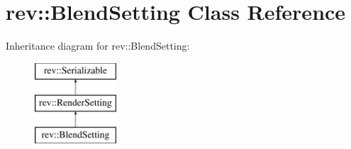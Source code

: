 \hypertarget{classrev_1_1_blend_setting}{}\section{rev\+::Blend\+Setting Class Reference}
\label{classrev_1_1_blend_setting}
Inheritance diagram for rev\+::Blend\+Setting\+:\begin{figure}[H]
\begin{center}
\leavevmode
\includegraphics[height=3.000000cm]{classrev_1_1_blend_setting}
\end{center}
\end{figure}
